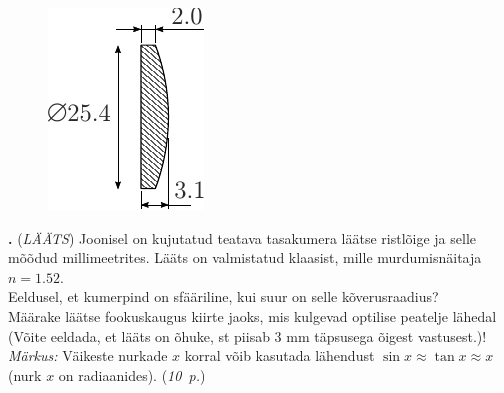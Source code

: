 \documentclass[11pt,a5paper]{article}
\newcommand{\numb}[1]{\vspace{5pt}\textbf{\large #1}}
\newcommand{\nimi}[1]{(\textsl{\small #1})}
\newcommand{\punktid}[1]{(\emph{#1~p.})}
\newcounter{ylesanne}
\newcommand{\yl}[1]{\addtocounter{ylesanne}{1}\numb{\theylesanne.} \nimi{#1} \newblock{}}
\newcommand{\autor}[1]{}%
\begin{document}
\begin{figure}
    \vspace{-30pt}
    \begin{center}
        \includegraphics[width=\linewidth]{tasakumer-laats}
    \end{center}
\end{figure}
\yl{LÄÄTS} 
Joonisel on kujutatud teatava tasakumera läätse ristlõige ja selle mõõdud millimeetrites. Lääts on valmistatud klaasist, mille murdumisnäitaja $n=\num{1.52}$.\\
\osa Eeldusel, et kumerpind on sfääriline, kui suur on selle kõverusraadius?\\
\osa Määrake läätse fookuskaugus kiirte jaoks, mis kulgevad optilise peatelje lähedal (Võite eeldada, et lääts on õhuke, st piisab 3 mm täpsusega õigest vastusest.)! \\ \emph{Märkus:} Väikeste nurkade $x$ korral võib kasutada lähendust $\sin{x} \approx \tan{x} \approx x$ (nurk $x$ on radiaanides).
\punktid{10} \autor{Valter Kiisk}
\end{document}
